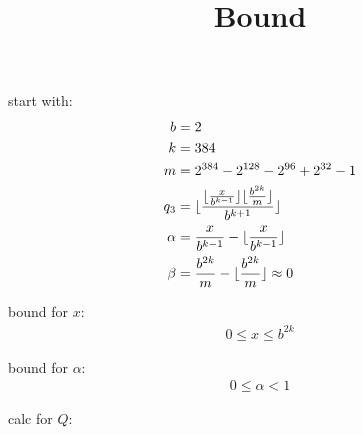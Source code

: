 \documentclass{article}
\title{Bound}
\date{}
\DeclarePairedDelimiter\floor{\lfloor}{\rfloor}
\begin{document}

start with:
\begin{align*}
    b &= 2 \\
    k &= 384 \\
    m &= 2^{384} - 2^{128} - 2^{96} + 2^{32} - 1\\
    q_3 &=  \floor{
        \frac
        {
            \floor{\frac{x}{b^{k-1}}} \floor{\frac{b^{2k}}{m}}
        }
        {b ^{k+1}}
        }\\
    \alpha &= \frac{x}{b^{k-1}} - \floor{\frac{x}{b^{k-1}}}\\
    \beta &= \frac{b^{2k}}{m} - \floor{\frac{b^{2k}}{m}} \approx 0
\end{align*}

bound for $x$:
\begin{align*}
0 \le x \le b^{2k}
\end{align*}

bound for $\alpha$:
\begin{align*}
0 \le  \alpha < 1
\end{align*}

calc for $Q$:
\end{document}
